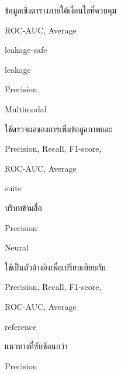 \documentclass[12pt,a4paper]{report}
\begin{document}
ข้อมูลเชิงตารางภายใต้เงื่อนไขที่ควบคุม\par
ROC-AUC, Average\par
leakage-safe\par
leakage\par
Precision\par
Multimodal\par
ใช้ตรวจผลของการเพิ่มข้อมูลภาพและ\par
Precision, Recall, F1-score,\par
ROC-AUC, Average\par
suite\par
บริบทข้ามสื่อ\par
Precision\par
Neural\par
ใช้เป็นตัวอ้างอิงเพื่อเปรียบเทียบกับ\par
Precision, Recall, F1-score,\par
ROC-AUC, Average\par
reference\par
แนวทางที่ซับซ้อนกว่า\par
Precision\par
\end{document}
